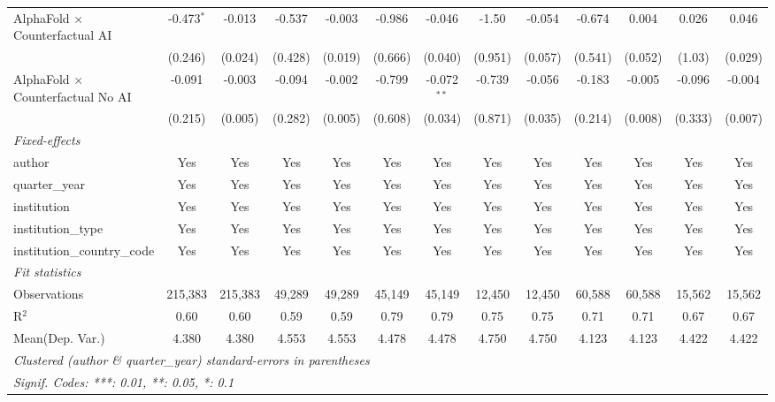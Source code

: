 \begin{tabular}{lcccccccccccc}
   AlphaFold $\times$ Counterfactual AI     & -0.473$^{*}$ & -0.013  & -0.537  & -0.003  & -0.986  & -0.046        & -1.50   & -0.054  & -0.674  & 0.004   & 0.026   & 0.046\\   
                                            & (0.246)      & (0.024) & (0.428) & (0.019) & (0.666) & (0.040)       & (0.951) & (0.057) & (0.541) & (0.052) & (1.03)  & (0.029)\\   
   AlphaFold $\times$ Counterfactual No AI  & -0.091       & -0.003  & -0.094  & -0.002  & -0.799  & -0.072$^{**}$ & -0.739  & -0.056  & -0.183  & -0.005  & -0.096  & -0.004\\   
                                            & (0.215)      & (0.005) & (0.282) & (0.005) & (0.608) & (0.034)       & (0.871) & (0.035) & (0.214) & (0.008) & (0.333) & (0.007)\\   
   \midrule
   \emph{Fixed-effects}\\
   author                                   & Yes          & Yes     & Yes     & Yes     & Yes     & Yes           & Yes     & Yes     & Yes     & Yes     & Yes     & Yes\\  
   quarter\_year                            & Yes          & Yes     & Yes     & Yes     & Yes     & Yes           & Yes     & Yes     & Yes     & Yes     & Yes     & Yes\\  
   institution                              & Yes          & Yes     & Yes     & Yes     & Yes     & Yes           & Yes     & Yes     & Yes     & Yes     & Yes     & Yes\\  
   institution\_type                        & Yes          & Yes     & Yes     & Yes     & Yes     & Yes           & Yes     & Yes     & Yes     & Yes     & Yes     & Yes\\  
   institution\_country\_code               & Yes          & Yes     & Yes     & Yes     & Yes     & Yes           & Yes     & Yes     & Yes     & Yes     & Yes     & Yes\\  
   \midrule
   \emph{Fit statistics}\\
   Observations                             & 215,383      & 215,383 & 49,289  & 49,289  & 45,149  & 45,149        & 12,450  & 12,450  & 60,588  & 60,588  & 15,562  & 15,562\\  
   R$^2$                                    & 0.60         & 0.60    & 0.59    & 0.59    & 0.79    & 0.79          & 0.75    & 0.75    & 0.71    & 0.71    & 0.67    & 0.67\\  
Mean(Dep. Var.) & 4.380 & 4.380 & 4.553 & 4.553 & 4.478 & 4.478 & 4.750 & 4.750 & 4.123 & 4.123 & 4.422 & 4.422 \\
   \midrule \midrule
   \multicolumn{13}{l}{\emph{Clustered (author \& quarter\_year) standard-errors in parentheses}}\\
   \multicolumn{13}{l}{\emph{Signif. Codes: ***: 0.01, **: 0.05, *: 0.1}}\\
\end{tabular}
\par\endgroup
